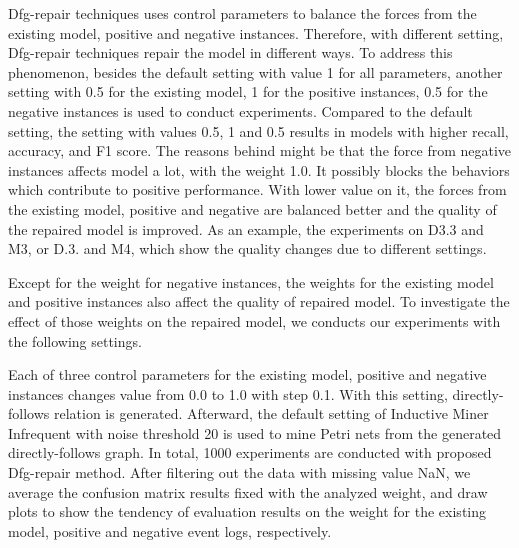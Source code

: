 Dfg-repair techniques uses control parameters to balance the forces from the existing model, positive and negative instances. Therefore, with different setting, Dfg-repair techniques repair the model in different ways. To address this phenomenon, besides the default setting with value 1 for all parameters, another setting with 0.5 for the existing model, 1 for the positive instances, 0.5 for the negative instances is used to conduct experiments.  Compared to the default setting, the setting with values 0.5, 1 and 0.5 results in models with higher recall, accuracy, and F1 score. The reasons behind might be that the force from negative instances affects model a lot, with the weight 1.0. It possibly blocks the behaviors which contribute to positive performance.  With lower value on it, the forces from the existing model, positive and negative are balanced better and the quality of the repaired model is improved. As an example, the experiments on D3.3 and M3, or D.3. and M4, which show the quality changes due to different settings.

Except for the weight for negative instances, the weights for the existing model and positive instances also affect the quality of repaired model. To investigate the effect of those weights on the repaired model, we conducts our experiments with the following settings.


Each of three control parameters for the existing model, positive and negative instances changes value from 0.0 to 1.0 with step 0.1. With this setting, directly-follows relation is generated. Afterward, the default setting of Inductive Miner Infrequent with noise threshold 20 is used to mine Petri nets from the generated directly-follows graph. In total, 1000 experiments are conducted with proposed Dfg-repair method. 
After filtering out the data with missing value NaN, we average the confusion matrix results fixed with the analyzed weight,  and draw plots to show the tendency of evaluation results on the weight for the existing model, positive and negative event logs, respectively. 

